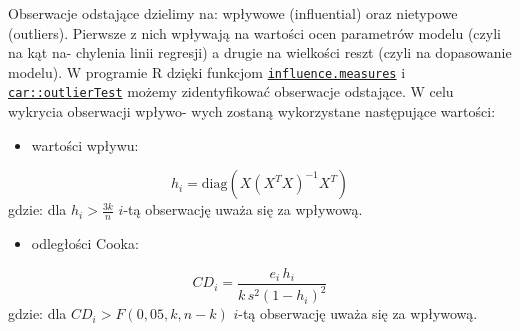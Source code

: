 \documentclass[polish,]{book}
\newenvironment{Shaded}{\begin{snugshade}}{\end{snugshade}}
\newcommand{\CommentTok}[1]{\textcolor[rgb]{0.56,0.35,0.01}{\textit{#1}}}
\newcommand{\KeywordTok}[1]{\textcolor[rgb]{0.13,0.29,0.53}{\textbf{#1}}}
\newcommand{\NormalTok}[1]{#1}
\newcommand{\OperatorTok}[1]{\textcolor[rgb]{0.81,0.36,0.00}{\textbf{#1}}}
\newcommand{\StringTok}[1]{\textcolor[rgb]{0.31,0.60,0.02}{#1}}
\providecommand{\tightlist}{%
  \setlength{\itemsep}{0pt}\setlength{\parskip}{0pt}}
\begin{document}
Obserwacje odstające dzielimy na: wpływowe (influential) oraz nietypowe (outliers).
Pierwsze z nich wpływają na wartości ocen parametrów modelu (czyli na kąt na-
chylenia linii regresji) a drugie na wielkości reszt (czyli na dopasowanie modelu). W
programie R dzięki funkcjom \href{https://rdrr.io/r/stats/influence.measures.html}{\texttt{influence.measures}} i \href{https://rdrr.io/cran/car/man/outlierTest.html}{\texttt{car::outlierTest}}
możemy zidentyfikować obserwacje odstające. W celu wykrycia obserwacji wpływo-
wych zostaną wykorzystane następujące wartości:

\begin{itemize}
\tightlist
\item
  wartości wpływu:
\end{itemize}

\begin{equation}
h_i=\mbox{diag}\left(X(X^{T}X)^{-1}X^{T}\right)
\label{eq:wz1317}
\end{equation}
gdzie: dla \(h_i>\frac{3k}{n}\) \(i\)-tą obserwację uważa się za wpływową.

\begin{Shaded}
\end{Shaded}

\begin{itemize}
\tightlist
\item
  odległości Cooka:
\end{itemize}

\begin{equation}
CD_i=\frac{e_i\, h_i}{k\,s^2(1-h_i)^2}
\label{eq:wz1318}
\end{equation}
gdzie: dla \(CD_i>F(0,05,k,n-k)\) \(i\)-tą obserwację uważa się za wpływową.
\end{document}
